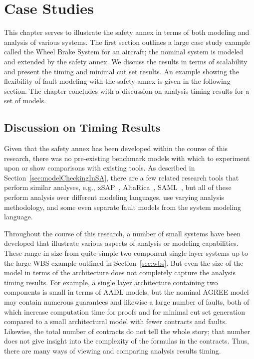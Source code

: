 \chapter{Case Studies}
\label{chap:caseStudies}
This chapter serves to illustrate the safety annex in terms of both modeling and analysis of various systems. The first section outlines a large case study example called the Wheel Brake System for an aircraft; the nominal system is modeled and extended by the safety annex. We discuss the results in terms of scalability and present the timing and minimal cut set results. An example showing the flexibility of fault modeling with the safety annex is given in the following section. The chapter concludes with a discussion on analysis timing results for a set of models. 




\section{Discussion on Timing Results}
Given that the safety annex has been developed within the course of this research, there was no pre-existing benchmark models with which to experiment upon or show comparisons with existing tools. As described in Section~\ref{sec:modelCheckingInSA}, there are a few related research tools that perform similar analyses, e.g., xSAP~\cite{DBLP:conf/tacas/BittnerBCCGGMMZ16}, AltaRica~\cite{signoret1998altarica}, SAML~\cite{Gudemann:2010:FQQ:1909626.1909813}, but all of these perform analysis over different modeling languages, use varying analysis methodology, and some even separate fault models from the system modeling language. 

Throughout the course of this research, a number of small systems have been developed that illustrate various aspects of analysis or modeling capabilities. These range in size from quite simple two component single layer systems up to the large WBS example outlined in Section~\ref{sec:wbs}. But even the size of the model in terms of the architecture does not completely capture the analysis timing results. For example, a single layer architecture containing two components is small in terms of AADL models, but the nominal AGREE model may contain numerous guarantees and likewise a large number of faults, both of which increase computation time for proofs and for minimal cut set generation compared to a small architectural model with fewer contracts and faults. Likewise, the total number of contracts do not tell the whole story; that number does not give insight into the complexity of the formulas in the contracts. Thus, there are many ways of viewing and comparing analysis results timing. 

